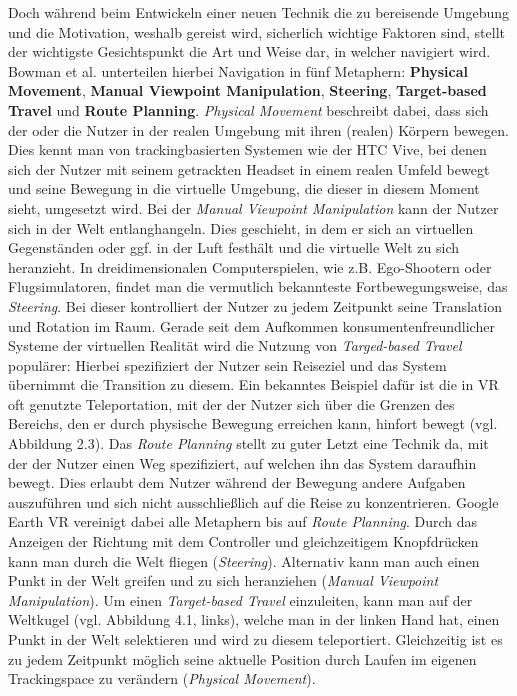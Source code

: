 Doch während beim Entwickeln einer neuen Technik die zu bereisende Umgebung und die Motivation, weshalb gereist wird, sicherlich wichtige Faktoren sind, stellt der wichtigste Gesichtspunkt die Art und Weise dar, in welcher navigiert wird. Bowman et al. \cite{Bowman2001AnDesign} unterteilen hierbei Navigation in fünf Metaphern: \textbf{Physical Movement}, \textbf{Manual Viewpoint Manipulation}, \textbf{Steering}, \textbf{Target-based Travel} und \textbf{Route Planning}. 
\textit{Physical Movement} beschreibt dabei, dass sich der oder die Nutzer in der realen Umgebung mit ihren (realen) Körpern bewegen. Dies kennt man von trackingbasierten Systemen wie der HTC Vive, bei denen sich der Nutzer mit seinem getrackten Headset in einem realen Umfeld bewegt und seine Bewegung in die virtuelle Umgebung, die dieser in diesem Moment sieht, umgesetzt wird.
Bei der \textit{Manual Viewpoint Manipulation} kann der Nutzer sich in der Welt \glqq entlanghangeln\grqq{}. Dies geschieht, in dem er sich an virtuellen Gegenständen oder ggf. in der Luft \glqq festhält\grqq{} und die virtuelle Welt zu sich \glqq heranzieht\grqq{}. 
In dreidimensionalen Computerspielen, wie z.B. Ego-Shootern oder Flugsimulatoren, findet man die vermutlich bekannteste Fortbewegungsweise, das \textit{Steering}. Bei dieser kontrolliert der Nutzer zu jedem Zeitpunkt seine Translation und Rotation im Raum.
Gerade seit dem Aufkommen konsumentenfreundlicher Systeme der virtuellen Realität wird die Nutzung von \textit{Targed-based Travel} populärer: Hierbei spezifiziert der Nutzer sein Reiseziel und das System übernimmt die Transition zu diesem.  Ein bekanntes Beispiel dafür ist die in VR oft genutzte Teleportation, mit der der Nutzer sich über die Grenzen des Bereichs, den er durch physische Bewegung erreichen kann, hinfort bewegt (vgl. Abbildung 2.3).
Das \textit{Route Planning} stellt zu guter Letzt eine Technik da, mit der der Nutzer einen Weg spezifiziert, auf welchen ihn das System daraufhin bewegt. Dies erlaubt dem Nutzer während der Bewegung andere Aufgaben auszuführen und sich nicht ausschließlich auf die Reise zu konzentrieren. Google Earth VR vereinigt dabei alle Metaphern bis auf \textit{Route Planning}. Durch das Anzeigen der Richtung mit dem Controller und gleichzeitigem Knopfdrücken kann man durch die Welt fliegen (\textit{Steering}). Alternativ kann man auch einen Punkt in der Welt greifen und zu sich heranziehen (\textit{Manual Viewpoint Manipulation}). Um einen \textit{Target-based Travel} einzuleiten, kann man auf der Weltkugel (vgl. Abbildung 4.1, links), welche man in der linken Hand hat, einen Punkt in der Welt selektieren und wird zu diesem teleportiert. Gleichzeitig ist es zu jedem Zeitpunkt möglich seine aktuelle Position durch Laufen im eigenen Trackingspace zu verändern (\textit{Physical Movement}).

